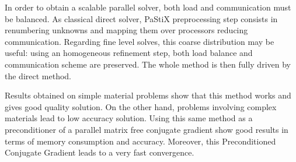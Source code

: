 \documentclass{report}
\begin{document}
In order to obtain a scalable parallel solver,
both load and communication must be balanced. As
classical direct solver, PaStiX preprocessing step
consists in renumbering unknowns and mapping them
over processors reducing communication. Regarding
fine level solves, this coarse distribution may be
useful: using an homogeneous refinement step, both
load balance and communication scheme are
preserved. The whole method is then fully driven
by the direct method.

Results obtained on simple material problems show
that this method works and gives good quality
solution. On the other hand, problems involving
complex materials lead to low accuracy
solution. Using this same method as a
preconditioner of a parallel matrix free conjugate
gradient show good results in terms of memory
consumption and accuracy. Moreover, this
Preconditioned Conjugate Gradient leads to a very
fast convergence.
\end{document}
